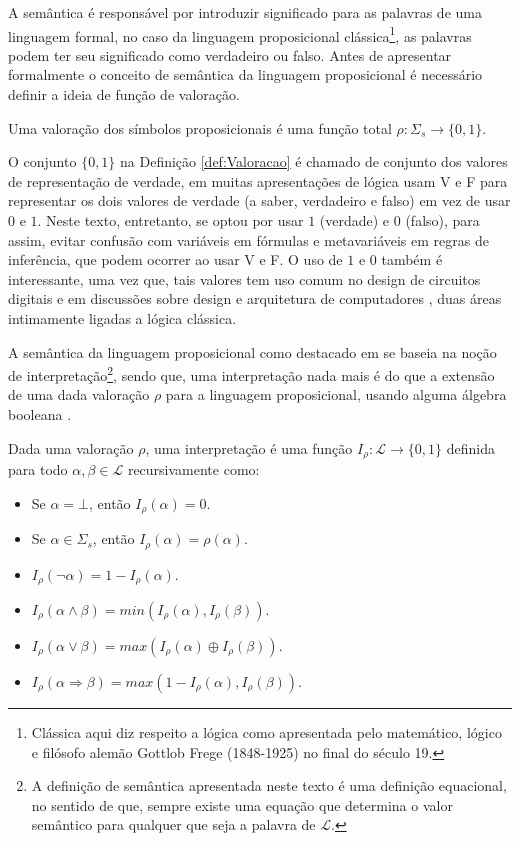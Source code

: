 A semântica é responsável por introduzir significado para as palavras de uma linguagem formal, no caso da linguagem proposicional clássica\footnote{Clássica aqui diz respeito a lógica como apresentada pelo  matemático, lógico e filósofo alemão Gottlob Frege (1848-1925) no final do século 19.}, as palavras podem ter seu significado como verdadeiro ou falso. Antes de apresentar formalmente o conceito de semântica da linguagem proposicional é necessário definir a ideia de função de  valoração.

\begin{definicao}[Valoração]\label{def:Valoracao}
  Uma valoração dos símbolos proposicionais é uma função total $\rho : \Sigma_s \rightarrow \{0,1\}$.
\end{definicao}

O conjunto $\{0,1\}$ na Definição \ref{def:Valoracao} é chamado de conjunto dos valores de representação de verdade, em muitas apresentações de lógica usam V e F para representar os dois valores de verdade (a saber, verdadeiro e falso) em vez de usar $0$ e $1$. Neste texto, entretanto, se optou por usar $1$ (verdade) e $0$ (falso), para assim, evitar confusão com variáveis em fórmulas e metavariáveis em regras de inferência, que podem ocorrer ao usar V e F. O uso de $1$ e $0$ também é interessante, uma vez que, tais valores tem uso comum no design de circuitos digitais \cite{capuano2018, holdsworth2002, lourencco1996} e em discussões sobre design e arquitetura de computadores \cite{murdocca2001, stallings2010}, duas áreas intimamente ligadas a lógica clássica.

A semântica da linguagem proposicional como destacado em \cite{joaoPavao2014} se baseia na noção de interpretação\footnote{A definição de semântica apresentada neste texto é uma definição equacional, no sentido de que, sempre existe uma equação que determina o valor semântico para qualquer que seja a palavra de $\mathcal{L}$.}, sendo que, uma interpretação nada mais é do que a extensão de uma dada valoração $\rho$ para a linguagem proposicional, usando alguma álgebra booleana \cite{boole1854, boole1957}.

\begin{definicao}[Interpretação]\label{def:interpretacat}
  Dada uma valoração $\rho$, uma interpretação é uma função $I_\rho : \mathcal{L} \rightarrow \{0,1\}$ definida para todo $\alpha, \beta \in \mathcal{L}$ recursivamente como:
  \begin{itemize}
       \item Se $\alpha = \bot$, então $I_\rho(\alpha) = 0$.
       \item Se $\alpha \in \Sigma_s$, então $I_\rho(\alpha) = \rho(\alpha)$.
       \item $I_\rho(\neg \alpha) = 1 - I_\rho(\alpha)$.
       \item $I_\rho(\alpha \land \beta) = min(I_\rho(\alpha), I_\rho(\beta))$.
       \item $I_\rho(\alpha \lor \beta) = max(I_\rho(\alpha) \oplus I_\rho(\beta))$.
       \item $I_\rho(\alpha \Rightarrow \beta) = max(1 - I_\rho(\alpha), I_\rho(\beta))$.
  \end{itemize}
\end{definicao}

